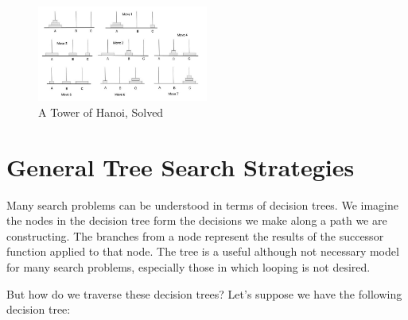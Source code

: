 \documentclass[12pt]{article}
\begin{document}
\begin{figure}[h]
  \centering
  \includegraphics[width=0.5\textwidth]{general-search-hanoi.jpg}
	\caption{A Tower of Hanoi, Solved}
  \label{fig:tower}
\end{figure}

\newpage

\section*{General Tree Search Strategies}

Many search problems can be understood in terms of decision trees. We imagine the nodes in the decision tree form the decisions we make along a path we are constructing. The branches from a node represent the results of the successor function applied to that node. The tree is a useful although not necessary model for many search problems, especially those in which looping is not desired.

But how do we traverse these decision trees? Let's suppose we have the following decision tree:
\end{document}
